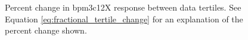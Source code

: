 \begin{landscape}
\begin{figure}[t]
\label{fig:tert_coeffYSlope}
\end{figure}
\begin{figure}[t]

\centering
{}
\caption{Percent change in bpm3c12X response between data tertiles. See Equation \ref{eq:fractional_tertile_change} for an explanation of the percent change shown.}

\label{fig:tert_coeff3c12X}
\end{figure}
\end{landscape}

